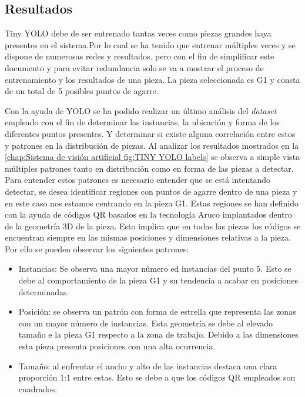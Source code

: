 \subsection{Resultados}
\label{chap:Sistema de visión artificial sec:Tiny YOLO Resultados}
Tiny YOLO debe de ser entrenado tantas veces como piezas grandes haya presentes en el sistema.Por lo cual se ha tenido que entrenar múltiples veces y se dispone de numerosas redes y resultados. pero con el fin de simplificar este documento y para evitar redundancia solo se va a mostrar el proceso de entrenamiento y los resultados de una pieza. La pieza seleccionada es G1 y consta de un total de 5 posibles puntos de agarre.

Con la ayuda de YOLO se ha podido realizar un último análisis del \textit{dataset} empleado con el fin de determinar las instancias, la ubicación y forma de los diferentes puntos presentes. Y determinar si existe alguna correlación entre estos y patrones en la distribución de piezas. Al analizar los resultados mostrados en la \autoref{chap:Sistema de visión artificial fig:TINY YOLO labels} se observa a simple vista múltiples patrones tanto en distribución como en forma de las piezas a detectar. Para entender estos patrones es necesario entender que se está intentando detectar, se desea identificar regiones con puntos de agarre dentro de una pieza y en este caso nos estamos centrando en la pieza G1. Estas regiones se han definido con la ayuda de códigos QR basados en la tecnología Aruco implantados dentro de la geometría 3D de la pieza. Esto implica que en todas las piezas los códigos se encuentran siempre en las mismas posiciones y dimensiones relativas a la pieza. Por ello se pueden observar los siguientes patrones:

\begin{itemize}
\item Instancias: Se observa una mayor número ed instancias del punto 5. Esto se debe al comportamiento de la pieza G1 y su tendencia a acabar en posiciones determinadas.
\item Posición: se observa un patrón con forma de estrella que representa las zonas con un mayor número de instancias. Esta geometría se debe al elevado tamaño e la pieza G1 respecto a la zona de trabajo. Debido a las dimensiones esta pieza presenta posiciones con una alta ocurrencia.
\item Tamaño: al enfrentar el ancho y alto de las instancias destaca una clara proporción 1:1 entre estas. Esto se debe a que los códigos QR empleados son cuadrados.
\end{itemize}

